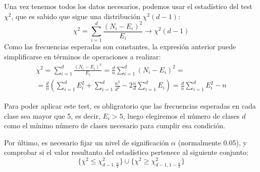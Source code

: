 Una vez tenemos todos los datos necesarios, podemos usar el estadístico del test $\chi^2$, que es sabido que sigue una distribución $\chi^2(d-1)$:
\[
\chi^2=\sum_{i=1}^d\frac{(N_i-E_i)^2}{E_i} \longrightarrow \chi^2(d-1)
\]
Como las frecuencias esperadas son constantes, la expresión anterior puede simplificarse en términos de operaciones a realizar:
\begin{multline}
\chi^2=\sum_{i=1}^d\frac{(N_i-E_i)^2}{E_i}=\frac{d}{n}\sum_{i=1}^d(N_i-E_i)^2= \\
=\frac{d}{n}\left(\sum_{i=1}^dE_i^2+\sum_{i=1}^d\frac{n^2}{d^2}-2\frac{n}{d}\sum_{i=1}^dE_i\right)=\frac{d}{n}\sum_{i=1}^dE_i^2-n
\end{multline}

Para poder aplicar este test, es obligratorio que las frecuencias esperadas en cada clase sea mayor que 5, es decir, $E_i>5$, luego elegiremos el número de clases $d$ como el mínimo número de clases necesario para cumplir esa condición.

Por último, es necesario fijar un nivel de significación $\alpha$ (normalmente  0.05), y comprobar si el valor resultanto del estadístico pertenece al siguiente conjunto:
\[
\{\chi^2\leq \chi^2_{d-1,\frac{\alpha}{2}}\}\cup\{\chi^2\geq \chi^2_{d-1,1-\frac{\alpha}{2}}\}
\]
